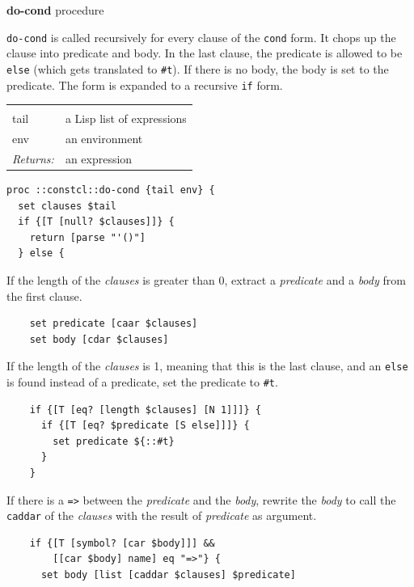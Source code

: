 \documentclass[a5paper,draft]{memoir}
\begin{document}
\textbf{do-cond} procedure

\texttt{do-cond} is called recursively for every clause of the \texttt{cond} form. It chops up the clause into predicate and body. In the last clause, the predicate is allowed to be \texttt{else} (which gets translated to \texttt{\#t}). If there is no body, the body is set to the predicate. The form is expanded to a recursive \texttt{if} form.

\noindent\begin{tabular}{ |p{1.9cm} p{6.5cm}| }
\hline
\rowcolor[HTML]{CCCCCC} \multicolumn{2}{|l|}{\textbf{do-cond (internal)}} \\
tail & a Lisp list of expressions \\
env & an environment \\
\textit{Returns:} & an expression \\
\hline
\end{tabular}

\begin{lstlisting}
proc ::constcl::do-cond {tail env} {
  set clauses $tail
  if {[T [null? $clauses]]} {
    return [parse "'()"]
  } else {
\end{lstlisting}

If the length of the \emph{clauses} is greater than 0, extract a \emph{predicate} and a \emph{body} from the first clause.

\begin{lstlisting}
    set predicate [caar $clauses]
    set body [cdar $clauses]
\end{lstlisting}

If the length of the \emph{clauses} is 1, meaning that this is the last clause, and an \texttt{else} is found instead of a predicate, set the predicate to \texttt{\#t}.

\begin{lstlisting}
    if {[T [eq? [length $clauses] [N 1]]]} {
      if {[T [eq? $predicate [S else]]]} {
        set predicate ${::#t}
      }
    }
\end{lstlisting}

If there is a \texttt{=>} between the \emph{predicate} and the \emph{body}, rewrite the \emph{body} to call the \texttt{caddar} of the \emph{clauses} with the result of \emph{predicate} as argument.

\begin{lstlisting}
    if {[T [symbol? [car $body]]] &&
        [[car $body] name] eq "=>"} {
      set body [list [caddar $clauses] $predicate]
\end{lstlisting}
\end{document}
